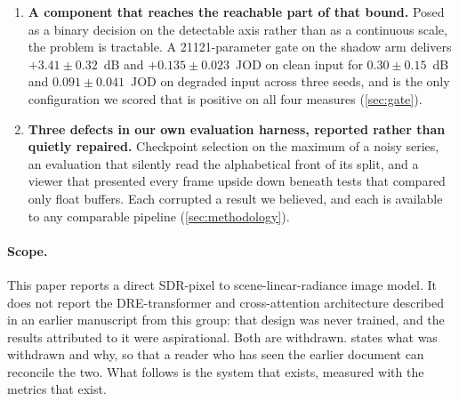 \begin{enumerate}
\item \textbf{A component that reaches the reachable part of that bound.} Posed
  as a binary decision on the detectable axis rather than as a continuous scale,
  the problem is tractable. A \num{21121}-parameter gate on the shadow arm
  delivers $+3.41 \pm 0.32$~dB and $+0.135 \pm 0.023$~JOD on clean input
  for $0.30 \pm 0.15$~dB and $0.091 \pm 0.041$~JOD on degraded input
  across three seeds, and is the only configuration we scored that is positive
  on all four measures (\cref{sec:gate}).

\item \textbf{Three defects in our own evaluation harness, reported rather than
  quietly repaired.} Checkpoint selection on the maximum of a noisy series, an
  evaluation that silently read the alphabetical front of its split, and a
  viewer that presented every frame upside down beneath tests that compared only
  float buffers. Each corrupted a result we believed, and each is available to
  any comparable pipeline (\cref{sec:methodology}).
\end{enumerate}

\paragraph{Scope.}
This paper reports a direct SDR-pixel to scene-linear-radiance image model. It
does not report the DRE-transformer and cross-attention architecture described
in an earlier manuscript from this group: that design was never trained, and the
results attributed to it were aspirational. Both are withdrawn.
 states what was withdrawn and why, so that a reader who
has seen the earlier document can reconcile the two. What follows is the system
that exists, measured with the metrics that exist.
